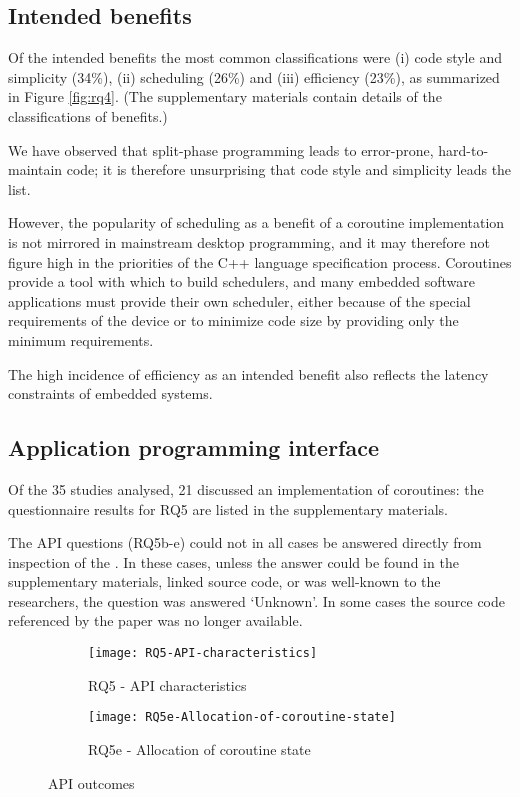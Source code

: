 \subsection{Intended benefits}

Of the intended benefits the most common classifications were (i) code style and simplicity (34\%), (ii) scheduling (26\%) and (iii) efficiency (23\%), as summarized in Figure \ref{fig:rq4}. (The supplementary materials contain details of the classifications of benefits.)

We have observed that split-phase programming leads to error-prone, hard-to-maintain code; it is therefore unsurprising that code style and simplicity leads the list.

However, the popularity of scheduling as a benefit of a coroutine implementation is not mirrored in mainstream desktop programming, and it may therefore not figure high in the priorities of the C++ language specification process. Coroutines provide a tool with which to build schedulers, and many embedded software applications must provide their own scheduler, either because of the special requirements of the device \cite{Inam2011, Park2015, Susilo2009} or to minimize code size by providing only the minimum requirements.

The high incidence of efficiency as an intended benefit also reflects the latency constraints of embedded systems.

\subsection{Application programming interface}

Of the 35 studies analysed, 21 discussed an implementation of coroutines: the questionnaire results for RQ5 are listed in the supplementary materials.

The API questions (RQ5b-e) could not in all cases be answered directly from inspection of the \DIFdelbegin {}\DIFdelend \DIFaddbegin {}\DIFaddend . In these cases, unless the answer could be found in the supplementary materials, linked source code, or was well-known to the researchers, the question was answered ‘Unknown’. In some cases the source code referenced by the paper was no longer available.

\begin{figure}[h]
	\centering
	\begin{subfigure}[h]{0.46\textwidth}
		\centering
		\texttt{[image: RQ5-API-characteristics]}
		\caption{RQ5 - API characteristics}
		\label{fig:rq5}
	\end{subfigure}
	\begin{subfigure}[h]{0.46\textwidth}
		\centering
		\texttt{[image: RQ5e-Allocation-of-coroutine-state]}
		\caption{RQ5e - Allocation of coroutine state}
		\label{fig:rq5e}
	\end{subfigure}
	\caption{API outcomes}
\end{figure}


